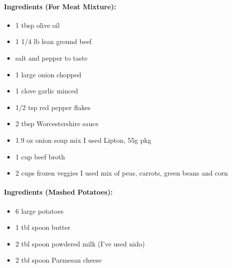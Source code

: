 \documentclass{article}
\begin{document}
\paragraph{Ingredients (For Meat Mixture):}
\begin{itemize}
  \item 1 tbsp olive oil
  \item 1 1/4 lb lean ground beef
  \item salt and pepper to taste
  \item 1 large onion chopped
  \item 1 clove garlic minced
  \item 1/2 tsp red pepper flakes
  \item 2 tbsp Worcestershire sauce
  \item 1.9 oz onion soup mix I used Lipton, 55g pkg
  \item 1 cup beef broth
  \item 2 cups frozen veggies I used mix of peas, carrots, green beans and corn
\end{itemize}

\paragraph{Ingredients (Mashed Potatoes):}
\begin{itemize}
  \item 6 large potatoes
  \item 1 tbl spoon butter
  \item 2 tbl spoon powdered milk (I’ve used nido)
  \item 2 tbl spoon Parmesan cheese
\end{itemize}
\end{document}
